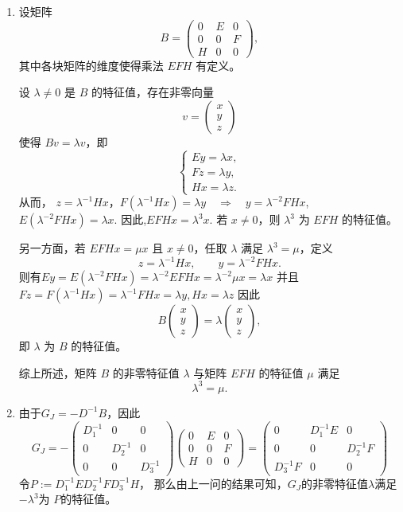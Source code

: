 \documentclass{ctexart}
\begin{document}
\begin{solution}
\begin{enumerate}
  \item 设矩阵
\[
B = 
\begin{pmatrix}
0 & E & 0 \\
0 & 0 & F \\
H & 0 & 0
\end{pmatrix},
\]
其中各块矩阵的维度使得乘法 $EFH$ 有定义。

设 $\lambda \ne 0$ 是 $B$ 的特征值，存在非零向量
\[
v = 
\begin{pmatrix}
x \\ y \\ z
\end{pmatrix}
\]
使得 $Bv = \lambda v$，即
\[
\begin{cases}
E y = \lambda x, \\
F z = \lambda y, \\
H x = \lambda z.
\end{cases}
\]
从而， $z = \lambda^{-1} H x$，\(F(\lambda^{-1} H x) = \lambda y \quad \Rightarrow \quad y = \lambda^{-2} F H x\),\(E(\lambda^{-2} F H x) = \lambda x\).
因此,\(E F H x = \lambda^3 x\).
若 $x \ne 0$，则 $\lambda^3$ 为 $EFH$ 的特征值。

另一方面，若 $EFH x = \mu x$ 且 $x \ne 0$，任取 $\lambda$ 满足 $\lambda^3 = \mu$，定义
\[
z = \lambda^{-1} H x, \qquad y = \lambda^{-2} F H x.
\]
则有\(E y = E (\lambda^{-2} F H x) = \lambda^{-2} E F H x = \lambda^{-2} \mu x = \lambda x\)
并且\(F z = F (\lambda^{-1} H x) = \lambda^{-1} F H x = \lambda y, H x = \lambda z\)
因此
\[
B
\begin{pmatrix}
x \\ y \\ z
\end{pmatrix}
=
\lambda
\begin{pmatrix}
x \\ y \\ z
\end{pmatrix},
\]
即 $\lambda$ 为 $B$ 的特征值。

综上所述，矩阵 $B$ 的非零特征值 $\lambda$ 与矩阵 $EFH$ 的特征值 $\mu$ 满足
\[
\lambda^3 = \mu.
\]
\item 由于\(G_J=-D^{-1}B \)，因此\[
    G_J=-\begin{pmatrix}
      D_1^{-1}&0&0\\
      0&D_2^{-1}&0\\ 
      0&0&D_3^{-1}
      \end{pmatrix}
      \begin{pmatrix}
        0&E&0\\ 
        0&0&F\\ 
        H&0&0
        \end{pmatrix}
        =\begin{pmatrix}
          0&D_1^{-1}E&0\\
          0&0&D_2^{-1}F\\ 
          D_3^{-1}F&0&0
          \end{pmatrix}
\] 
令\(P:=D_1^{-1}ED_2^{-1}FD_3^{-1}H \)，
那么由上一问的结果可知，\(G_J \)的非零特征值\(\lambda \)满足\(-\lambda^3 \)为 \(P \)的特征值。


\end{enumerate}
\end{solution}
\end{document}
